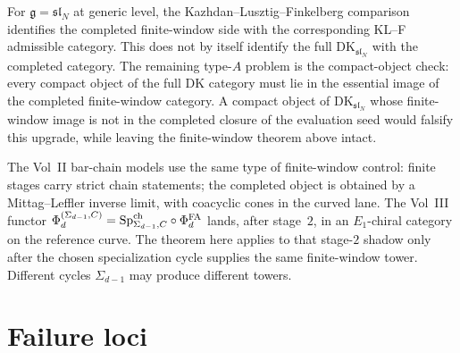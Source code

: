 \begin{remark}
\label{rem:type-A-completion-conjecture-resolved}
%
For $\mathfrak g=\mathfrak{sl}_N$ at generic level, the
Kazhdan--Lusztig--Finkelberg comparison identifies the completed
finite-window side with the corresponding KL--F admissible category.
This does not by itself identify the full
$\mathrm{DK}_{\mathfrak{sl}_N}$ with the completed category.  The
remaining type-$A$ problem is the compact-object check:
every compact object of the full DK category must lie in the essential
image of the completed finite-window category.  A compact object of
$\mathrm{DK}_{\mathfrak{sl}_N}$ whose finite-window image is not in
the completed closure of the evaluation seed would falsify this
upgrade, while leaving the finite-window theorem above intact.
\end{remark}

\begin{remark}
\label{rem:coherence-vol2-vol3-mc3-completed}
The Vol~II bar-chain models use the same type of finite-window
control: finite stages carry strict chain statements; the completed
object is obtained by a Mittag--Leffler inverse limit, with coacyclic
cones in the curved lane.  The Vol~III functor
$\Phi_d^{(\Sigma_{d-1},C)}=\mathrm{Sp}^{\mathrm{ch}}_{\Sigma_{d-1},C}\circ\Phi^{\mathrm{FA}}_d$ lands, after stage~$2$,
in an $E_1$-chiral category on the reference curve.  The theorem here
applies to that stage-$2$ shadow only after the chosen specialization
cycle supplies the same finite-window tower.  Different cycles
$\Sigma_{d-1}$ may produce different towers.
\end{remark}

\section{Failure loci}
\label{sec:falsification-surfaces-comparison-gap-completed}

